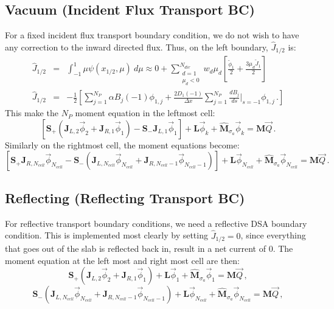 \documentclass[11pt]{article}
\newcommand{\benum}{\begin{equation}}
\newcommand{\eenum}{\end{equation}}
\newcommand{\beanum}{\begin{eqnarray}}
\newcommand{\eeanum}{\end{eqnarray}}
\newcommand{\B}[1]{\ensuremath{{B_{#1} }}}
\newcommand{\p}{\ensuremath{ d}}
\newcommand{\M}{\ensuremath{ \mathbf M}}
\newcommand{\Mw}{\ensuremath{\widehat{\mathbf M}}}
\newcommand{\pec}{\, ,}
\newcommand{\pep}{\, .}
\begin{document}
\subsection{Vacuum (Incident Flux Transport BC)}
For a fixed incident flux transport boundary condition, we do not wish to have any correction to the inward directed flux.  Thus, on the left boundary, $\widehat{J}_{1/2}$ is:
\beanum
\widehat{J}_{1/2} &=& \int_{-1}^1{\mu \psi(x_{1/2},\mu)~d\mu} \approx 0 + \sum_{\substack{d=1 \\\mu_d < 0}}^{N_{dir}}{w_d \mu_d\left[\frac{\widetilde{\phi}_1}{2} + \frac{3\mu_d \widetilde{J}_1}{2}  \right] }\\
\widehat{J}_{1/2} &=& -\frac{1}{2}\left[
\sum_{j=1}^{N_P}{\alpha \B{j}(-1) \phi_{1,j}  +
\frac{2D_1(-1)}{\Delta x}  \sum_{j=1}^{N_P}
\frac{\p \B{j}}{\p s} \bigg \lvert_{s=-1} \phi_{1,j}} \pep
\right]
\eeanum
This make the $N_P$ moment equation in the leftmost cell:
\benum
\left[ \mathbf{S}_+\left(\mathbf{J}_{L,2} \vec{\phi}_{2} + \mathbf{J}_{R,1} \vec{\phi}_{1} \right) -
\mathbf{S}_- \mathbf{J}_{L,1} \vec{\phi}_1  \right]
+ \mathbf{L}\vec{\phi}_k + \Mw_{\sigma_a} \vec{\phi}_k = \M \vec{Q} \pep
\eenum
Similarly on the rightmost cell, the moment equations become:
\benum
\left[ \mathbf{S}_+ \mathbf{J}_{R,N_{cell}} \vec{\phi}_{N_{cell}} -
\mathbf{S}_- \left(\mathbf{J}_{L,N_{cell}} \vec{\phi}_{N_{cell}} + \mathbf{J}_{R,N_{cell}-1} \vec{\phi}_{N_{cell}-1} \right) \right]
+ \mathbf{L}\vec{\phi}_{N_{cell}} + \Mw_{\sigma_a} \vec{\phi}_{N_{cell}} = \M \vec{Q} \pep
\eenum

\subsection{Reflecting (Reflecting Transport BC)}

For reflective transport boundary conditions, we need a reflective DSA boundary condition.  This is implemented most clearly by setting $\widehat{J}_{1/2}=0$, since everything that goes out of the slab is reflected back in, result in a net current of $0$.  The moment equation at the left most and right most cell are then:
\benum
\mathbf{S}_+\left(\mathbf{J}_{L,2} \vec{\phi}_{2} + \mathbf{J}_{R,1} \vec{\phi}_{1} \right) 
+ \mathbf{L}\vec{\phi}_1 + \Mw_{\sigma_a} \vec{\phi}_1 = \M \vec{Q} \pec
\eenum
\benum
\mathbf{S}_- \left(\mathbf{J}_{L,N_{cell}} \vec{\phi}_{N_{cell}} + \mathbf{J}_{R,N_{cell}-1} \vec{\phi}_{N_{cell}-1} \right) 
+ \mathbf{L}\vec{\phi}_{N_{cell}} + \Mw_{\sigma_a} \vec{\phi}_{N_{cell}} = \M \vec{Q} \pec
\eenum
\end{document}
